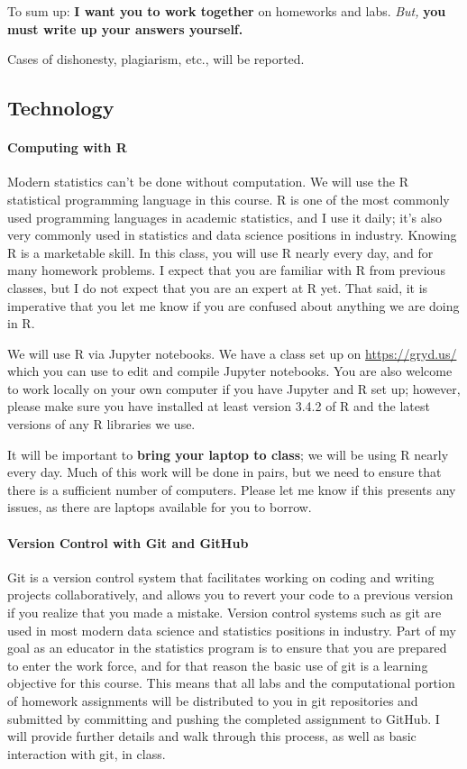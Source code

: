 \documentclass[11pt]{article}
\begin{document}
To sum up: \textbf{I want you to work together} on homeworks and labs.  \emph{But,} \textbf{you must write up your answers yourself.}

Cases of dishonesty, plagiarism, etc., will be reported.

\subsection*{Technology}

\paragraph{Computing with R}

Modern statistics can't be done without computation.  We will use the R statistical programming language in this course.  R is one of the most commonly used programming languages in academic statistics, and I use it daily; it's also very commonly used in statistics and data science positions in industry.  Knowing R is a marketable skill.  In this class, you will use R nearly every day, and for many homework problems.  I expect that you are familiar with R from previous classes, but I do not expect that you are an expert at R yet.  That said, it is imperative that you let me know if you are confused about anything we are doing in R.

We will use R via Jupyter notebooks.  We have a class set up on \url{https://gryd.us/} which you can use to edit and compile Jupyter notebooks.  You are also welcome to work locally on your own computer if you have Jupyter and R set up; however, please make sure you have installed at least version 3.4.2 of R and the latest versions of any R libraries we use.

It will be important to \textbf{bring your laptop to class}; we will be using R nearly every day.  Much of this work will be done in pairs, but we need to ensure that there is a sufficient number of computers.  Please let me know if this presents any issues, as there are laptops available for you to borrow.

\paragraph{Version Control with Git and GitHub}

Git is a version control system that facilitates working on coding and writing projects collaboratively, and allows you to revert your code to a previous version if you realize that you made a mistake.  Version control systems such as git are used in most modern data science and statistics positions in industry.  Part of my goal as an educator in the statistics program is to ensure that you are prepared to enter the work force, and for that reason the basic use of git is a learning objective for this course.  This means that all labs and the computational portion of homework assignments will be distributed to you in git repositories and submitted by committing and pushing the completed assignment to GitHub.  I will provide further details and walk through this process, as well as basic interaction with git, in class.
\end{document}
